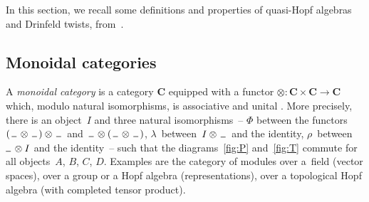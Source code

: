 \documentclass[pdftex]{sigma}
\numberwithin{equation}{section}
\theoremstyle{definition}
\begin{document}
In this section, we recall some def\/initions and properties of quasi-Hopf algebras and Drinfeld twists, from~\cite{CP94,Dri90,Dri91,ML98}.

\subsection{Monoidal categories}\label{sec:2.1}

A \emph{monoidal category} is a category $\mathbf{C}$ equipped with a functor \mbox{$\otimes\colon \mathbf{C}\times\mathbf{C}\to\mathbf{C}$} which, modulo natural isomorphisms, is associative and unital \cite[Section~5.1]{CP94}. More precisely, there is an object~$I$ and three natural isomorphisms~-- $\Phi$ between the functors $(\,\rule{5pt}{0.5pt}\,\otimes\,\rule{5pt}{0.5pt}\,)\otimes\,\rule{5pt}{0.5pt} $~and~$ \rule{5pt}{0.5pt}\,\otimes (\,\rule{5pt}{0.5pt}\,\otimes\,\rule{5pt}{0.5pt}\,)$, $\lambda$~between~$I\otimes\,\rule{5pt}{0.5pt}$~and the identity, $\rho$~between~$\rule{5pt}{0.5pt}\,\otimes I$ and the identity~-- such that the diagrams~\ref{fig:P} and~\ref{fig:T} commute for all objects~$A$, $B$, $C$, $D$.
Examples are the category of modules over a~f\/ield (vector spaces), over a group or a Hopf algebra (representations), over a topological Hopf algebra (with completed tensor product).
\end{document}
